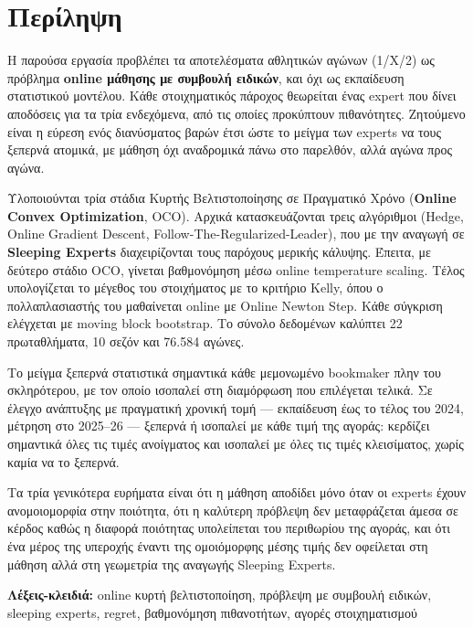 \documentclass[12pt,a4paper,oneside]{report}
\renewcommand{\_}{\oldunderscore\allowbreak}
\theoremstyle{definition}
\theoremstyle{plain}
\theoremstyle{remark}
\begin{document}
\chapter*{Περίληψη}

Η παρούσα εργασία προβλέπει τα αποτελέσματα αθλητικών αγώνων (1/Χ/2) ως πρόβλημα
\textbf{online μάθησης με συμβουλή ειδικών}, και όχι ως εκπαίδευση στατιστικού μοντέλου.
Κάθε στοιχηματικός πάροχος θεωρείται ένας expert που δίνει αποδόσεις για τα τρία ενδεχόμενα,
από τις οποίες προκύπτουν πιθανότητες. Ζητούμενο είναι η εύρεση ενός διανύσματος βαρών έτσι
ώστε το μείγμα των experts να τους ξεπερνά ατομικά, με μάθηση όχι αναδρομικά πάνω στο
παρελθόν, αλλά αγώνα προς αγώνα.

Υλοποιούνται τρία στάδια Κυρτής Βελτιστοποίησης σε Πραγματικό Χρόνο (\textbf{Online Convex
Optimization}, OCO). Αρχικά κατασκευάζονται τρεις αλγόριθμοι (Hedge, Online Gradient Descent,
Follow-The-Regularized-Leader), που με την αναγωγή σε \textbf{Sleeping Experts} διαχειρίζονται
τους παρόχους μερικής κάλυψης. Έπειτα, με δεύτερο στάδιο OCO, γίνεται βαθμονόμηση μέσω online
temperature scaling. Τέλος υπολογίζεται το μέγεθος του στοιχήματος με το κριτήριο Kelly, όπου
ο πολλαπλασιαστής του μαθαίνεται online με Online Newton Step. Κάθε σύγκριση ελέγχεται με
moving block bootstrap. Το σύνολο δεδομένων καλύπτει 22 πρωταθλήματα, 10 σεζόν και 76.584
αγώνες.

Το μείγμα ξεπερνά στατιστικά σημαντικά κάθε μεμονωμένο bookmaker πλην του σκληρότερου, με
τον οποίο ισοπαλεί στη διαμόρφωση που επιλέγεται τελικά. Σε έλεγχο ανάπτυξης με πραγματική
χρονική τομή --- εκπαίδευση έως το τέλος του 2024, μέτρηση στο 2025--26 --- ξεπερνά ή
ισοπαλεί με κάθε τιμή της αγοράς: κερδίζει σημαντικά όλες τις τιμές ανοίγματος και ισοπαλεί
με όλες τις τιμές κλεισίματος, χωρίς καμία να το ξεπερνά.

Τα τρία γενικότερα ευρήματα είναι ότι η μάθηση αποδίδει μόνο όταν οι experts έχουν
ανομοιομορφία στην ποιότητα, ότι η καλύτερη πρόβλεψη δεν μεταφράζεται άμεσα σε κέρδος καθώς
η διαφορά ποιότητας υπολείπεται του περιθωρίου της αγοράς, και ότι ένα μέρος της υπεροχής
έναντι της ομοιόμορφης μέσης τιμής δεν οφείλεται στη μάθηση αλλά στη γεωμετρία της αναγωγής
Sleeping Experts.

\vspace{1em}
\noindent\textbf{Λέξεις-κλειδιά:} online κυρτή βελτιστοποίηση, πρόβλεψη με συμβουλή ειδικών,
sleeping experts, regret, βαθμονόμηση πιθανοτήτων, αγορές στοιχηματισμού
\end{document}
